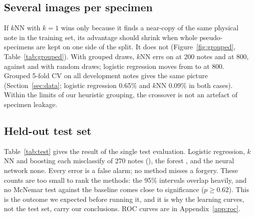 \subsection{Several images per specimen}
\label{sec:grouped}
If $k$NN with $k=1$ wins only because it finds a near-copy of the same physical note in the training set, its advantage should shrink when whole pseudo-specimens are kept on one side of the split. It does not (Figure~\ref{fig:grouped}, Table~\ref{tab:grouped}). With grouped draws, $k$NN errs on \gerrKNNTwoHundred{} at 200 notes and \gerrKNNEightHundred{} at 800, against \errKNNTwoHundred{} and \errKNNEightHundred{} with random draws; logistic regression moves from \errLREightHundred{} to \gerrLREightHundred{} at 800. Grouped 5-fold CV on all development notes gives the same picture (Section~\ref{sec:data}; logistic regression 0.65\% and $k$NN 0.09\% in both cases). Within the limits of our heuristic grouping, the crossover is not an artefact of specimen leakage.

\subsection{Held-out test set}
\label{sec:test}
\begin{table}[t]
  \centering
  \caption{One-time evaluation on the 270 test notes (122 forged), after tuning by 5-fold CV on all development notes. ``Missed'' are forged notes called genuine, ``False al.'' genuine notes called forged. The interval is a Wilson 95\% interval; $p$ is an exact McNemar test against logistic regression. $^\dagger$Extension.}
  \label{tab:test}
  \small
  \setlength{\tabcolsep}{4.5pt}
  
\end{table}

Table~\ref{tab:test} gives the result of the single test evaluation. Logistic regression, $k$NN and boosting each misclassify \testerrLR{} of 270 notes (\testLR{}), the forest \testerrRF{}, and the neural network none. Every error is a false alarm; no method misses a forgery. These counts are too small to rank the methods: the 95\% intervals overlap heavily, and no McNemar test against the baseline comes close to significance ($p\ge0.62$). This is the outcome we expected before running it, and it is why the learning curves, not the test set, carry our conclusions. ROC curves are in Appendix~\ref{app:roc}.
